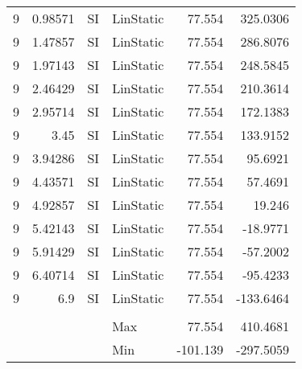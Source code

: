 \begin{table}[htbp]
{\begin{tabular}{rrrlrr}
    \multicolumn{1}{l}{9} & 0.98571 & \multicolumn{1}{l}{SI} & LinStatic & 77.554 & 325.0306 \\
    \multicolumn{1}{l}{9} & 1.47857 & \multicolumn{1}{l}{SI} & LinStatic & 77.554 & 286.8076 \\
    \multicolumn{1}{l}{9} & 1.97143 & \multicolumn{1}{l}{SI} & LinStatic & 77.554 & 248.5845 \\
    \multicolumn{1}{l}{9} & 2.46429 & \multicolumn{1}{l}{SI} & LinStatic & 77.554 & 210.3614 \\
    \multicolumn{1}{l}{9} & 2.95714 & \multicolumn{1}{l}{SI} & LinStatic & 77.554 & 172.1383 \\
    \multicolumn{1}{l}{9} & 3.45 & \multicolumn{1}{l}{SI} & LinStatic & 77.554 & 133.9152 \\
    \multicolumn{1}{l}{9} & 3.94286 & \multicolumn{1}{l}{SI} & LinStatic & 77.554 & 95.6921 \\
    \multicolumn{1}{l}{9} & 4.43571 & \multicolumn{1}{l}{SI} & LinStatic & 77.554 & 57.4691 \\
    \multicolumn{1}{l}{9} & 4.92857 & \multicolumn{1}{l}{SI} & LinStatic & 77.554 & 19.246 \\
    \multicolumn{1}{l}{9} & 5.42143 & \multicolumn{1}{l}{SI} & LinStatic & 77.554 & -18.9771 \\
    \multicolumn{1}{l}{9} & 5.91429 & \multicolumn{1}{l}{SI} & LinStatic & 77.554 & -57.2002 \\
    \multicolumn{1}{l}{9} & 6.40714 & \multicolumn{1}{l}{SI} & LinStatic & 77.554 & -95.4233 \\
    \multicolumn{1}{l}{9} & 6.9 & \multicolumn{1}{l}{SI} & LinStatic & 77.554 & -133.6464 \\
        &     &     &     &     &  \\
        &     &     & Max & 77.554 & 410.4681 \\
        &     &     & Min & -101.139 & -297.5059 \\
    \end{tabular}%
    }
  \label{tab:addlabel}%
\end{table}%
